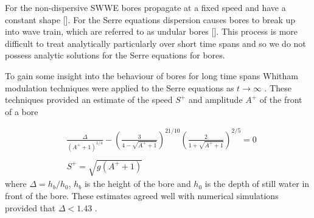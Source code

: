 For the non-dispersive SWWE bores propagate at a fixed speed and have a constant shape []. For the Serre equations dispersion causes bores to break up into wave train, which are referred to as undular bores []. This process is more difficult to treat analytically particularly over short time spans and so we do not possess analytic solutions for the Serre equations for bores.

To gain some insight into the behaviour of bores for long time spans Whitham modulation techniques were applied to the Serre equations as $t \rightarrow \infty$ \cite{El-etal-2006}. These techniques provided an estimate of the speed $S^+$ and amplitude $A^+$ of the front of a bore

\begin{subequations}
	\begin{align}
	&\frac{\Delta}{\left(A^+ + 1\right)^{1/4}} - \left(\frac{3}{4 -  \sqrt{A^+ + 1}}\right)^{21/10} \left(\frac{2}{1 + \sqrt{A^+ + 1}}\right)^{2/5} = 0	\label{eqn:Aplusdef} \\  \nonumber \\
	&S^+ = \sqrt{g \left(A^+ + 1\right)}	\label{eqn:Splusdef}
	\end{align}
	\label{eqn:ELWhitMod}	
\end{subequations}
where $\Delta = h_b / h_0$, $h_b$ is the height of the bore and $h_0$ is the depth of still water in front of the bore. These estimates agreed well with numerical simulations provided that $\Delta < 1.43$ \cite{El-etal-2006}.